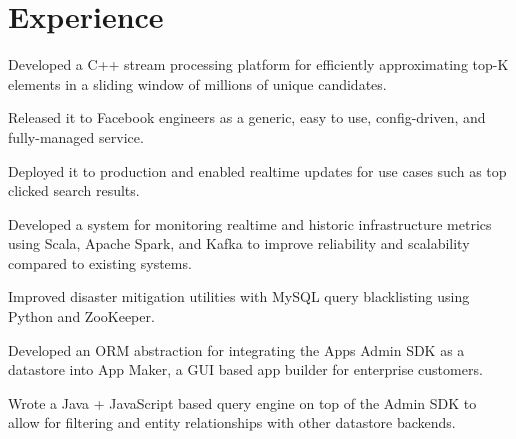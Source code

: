 \documentclass[]{resume}
\begin{document}
\begin{minipage}[t]{0.66\textwidth}


\section{Experience}

\vspace{\topsep} %
\begin{tightemize}
\item Developed a C++ stream processing platform for efficiently approximating top-K elements in a sliding window of millions of unique candidates.
\item Released it to Facebook engineers as a generic, easy to use, config-driven, and fully-managed service.
\item Deployed it to production and enabled realtime updates for use cases such as top clicked search results.
\end{tightemize}
\sectionsep

\begin{tightemize}
\item Developed a system for monitoring realtime and historic infrastructure metrics using Scala, Apache Spark, and Kafka to improve reliability and scalability compared to existing systems.
\item Improved disaster mitigation utilities with MySQL query blacklisting using Python and ZooKeeper.
\end{tightemize}
\sectionsep

\begin{tightemize}
\item Developed an ORM abstraction for integrating the Apps Admin SDK as a datastore into App Maker, a GUI based app builder for enterprise customers.
\item Wrote a Java + JavaScript based query engine on top of the Admin SDK to allow for filtering and entity relationships with other datastore backends.
\end{tightemize}
\sectionsep


\end{minipage}
\end{document}
